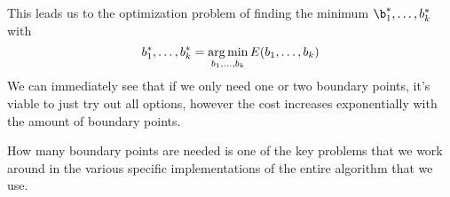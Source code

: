 This leads us to the optimization problem of finding the minimum $\b_1^*,\ldots,b_k^*$ with 
\[
b_1^*,\ldots,b_k^*=\operatorname*{arg\,min}_{b_1,\ldots,b_k} E(b_1,\ldots,b_k) 
\]
We can immediately see that if we only need one or two boundary points, it's viable to just try out all options, however the cost increases exponentially with the amount of boundary points.


How many boundary points are needed is one of the key problems that we work around in the various specific implementations of the entire algorithm that we use. 
